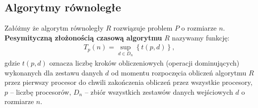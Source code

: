 \subsection{Algorytmy równoległe}


\begin{definicja}\label{def:pesymistyczna_zlozonosc_czasowa}
Załóżmy że algorytm równoległy \(R\) rozwiązuje problem \(P\) o rozmiarze \(n\). \textbf{Pesymityczną złożonością czasową algorytmu} \(R\) nazywamy funkcję:\\
\begin{align}
T_{p}(n) = \sup_{d\in{D_n}}{\left\{t(p,d)\right\}},
\end{align}
gdzie \(t(p,d)\) oznacza liczbę kroków obliczeniowych (operacji dominujących) wykonanych dla zestawu danych \(d\) od momentu rozpoczęcia obliczeń algorytmu \(R\) przez pierwszy procesor do chwili zakończenia obliczeń przez wszystkie procesory, \(p\) -- liczbę procesorów, \(D_n\) -- zbiór wszystkich zestawów danych wejściowych \(d\) o rozmiarze \(n\).
\end{definicja}
